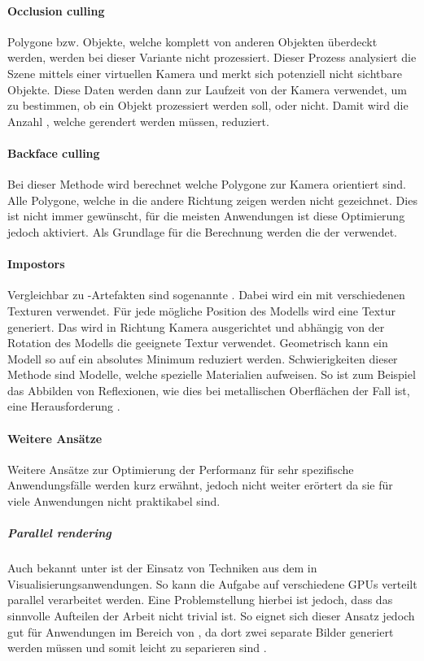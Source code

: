 \paragraph{Occlusion culling}
Polygone bzw. Objekte, welche komplett von anderen Objekten überdeckt werden, werden bei dieser Variante nicht prozessiert.
Dieser Prozess analysiert die Szene mittels einer virtuellen Kamera und merkt sich potenziell nicht sichtbare Objekte. Diese Daten werden dann zur Laufzeit von der Kamera verwendet, um zu bestimmen, ob ein Objekt prozessiert werden soll, oder nicht.
Damit wird die Anzahl , welche gerendert werden müssen, reduziert.

\paragraph{Backface culling}
\label{chap:backfaceCulling}
Bei dieser Methode wird berechnet welche Polygone zur Kamera orientiert sind.
Alle Polygone, welche in die andere Richtung zeigen werden nicht gezeichnet.
Dies ist nicht immer gewünscht, für die meisten Anwendungen ist diese Optimierung jedoch aktiviert.
Als Grundlage für die Berechnung werden die  der  verwendet.

\paragraph{Impostors}
Vergleichbar zu -Artefakten sind sogenannte . Dabei wird ein  mit verschiedenen Texturen verwendet. Für jede mögliche Position des Modells wird eine Textur generiert. Das  wird in Richtung Kamera ausgerichtet und abhängig von der Rotation des Modells die geeignete Textur verwendet. Geometrisch kann ein Modell so auf ein absolutes Minimum reduziert werden. Schwierigkeiten dieser Methode sind Modelle, welche spezielle Materialien aufweisen. So ist zum Beispiel das Abbilden von Reflexionen, wie dies bei metallischen Oberflächen der Fall ist, eine Herausforderung \cite{usingImpostors}.

\paragraph{Weitere Ansätze}
Weitere Ansätze zur Optimierung der Performanz für sehr spezifische Anwendungsfälle werden kurz erwähnt, jedoch nicht weiter erörtert da sie für viele Anwendungen nicht praktikabel sind.

\subparagraph{Parallel rendering}
Auch bekannt unter  ist der Einsatz von Techniken aus dem  in Visualisierungsanwendungen. So kann die Aufgabe auf verschiedene GPUs verteilt parallel verarbeitet werden. Eine Problemstellung hierbei ist jedoch, dass das sinnvolle Aufteilen der Arbeit nicht trivial ist. So eignet sich dieser Ansatz jedoch gut für Anwendungen im Bereich von , da dort zwei separate Bilder generiert werden müssen und somit leicht zu separieren sind \cite{parallelRenderingPhd}.


